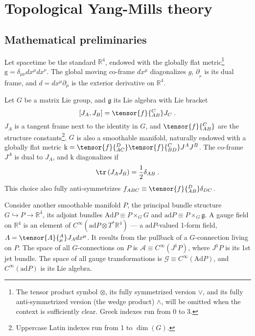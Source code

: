 \documentclass[../main/tex]{subfiles}
\begin{document}
\section{Topological Yang-Mills theory}\label{sec:tym}

\subsection{Mathematical preliminaries}\label{ssec:math-preliminaries;sec:tym}

Let spacetime be the standard $\mathbb{R}^4$, endowed with the globally flat metric\footnote{The tensor product symbol $\otimes$, its fully symmetrized version $\vee$, and its fully anti-symmetrized version (the wedge product) $\wedge$, will be omitted when the context is sufficiently clear. Greek indexes run from 0 to 3.} $ \mathrm{g} =\delta_{\mu\nu}dx^\mu dx^\nu$. The global moving co-frame $dx^\mu$ diagonalizes $ g $, $ \partial_{ _\mu } $ is its dual frame, and $d=dx^{\mu}\partial_{ \mu }$ is the exterior derivative on $\mathbb{R}^4$.

Let $G$ be a matrix Lie group, and $\mathfrak{g}$ its Lie algebra with Lie bracket
\begin{equation}
  \label{eq:G lie algebra}
  \left[ J_{A}, J_{B} \right]=\tensor{f}{_{AB}^C}J_C \;.
\end{equation}
$J_A$ is a tangent frame next to the identity in $G$, and $\tensor{f}{_{AB}^C}$ are the structure constants\footnote{Uppercase Latin indexes run from 1 to $\dim\left(G\right)$.}. $G$ is also a smoothable manifold, naturally endowed with a globally flat metric $ \mathrm{k} = \tensor{ f }{ _{AC}^D } \tensor{ f }{ _{BD}^C } J^A J^B $. The co-frame $ J^A $ is dual to $J_A$, and $ \mathrm{k} $ diagonalizes if
\begin{equation}
  \label{eq:orthonormal generators}
  \tr\left(J_A J_B\right) = \frac{1}{2}\delta_{AB} \;.
\end{equation}
This choice also fully anti-symmetrizes $f_{ABC}\equiv \tensor{f}{_{AB}^D}\delta_{DC}$.

Consider another smoothable manifold $ P $, the principal bundle structure $G \hookrightarrow P \rightarrow \mathbb{R}^4$, its adjoint bundles $ \mathrm{Ad} P \equiv P \times_G G $ and $ \mathrm{ad}P \equiv P \times_G \mathfrak{g}$. A gauge field on $ \mathbb{R}^4 $ is an element of $C^\infty \left( \mathrm{ad}P \otimes T^*\mathbb{R}^4 \right)$ --- a $ \mathrm{ad} P $-valued 1-form field, $ A=\tensor{A}{ ^A_\mu }J_A dx^\mu $. It results from the pullback of a $G$-connection living on $ P $. The space of all $G$-connections on $ P $ is $ \mathcal{A} \equiv C^{ \infty } \left( J^1 P \right) $, where $ J^1 P $ is its 1st jet bundle. The space of all gauge transformations is $ \mathcal{G} \equiv C^{ \infty }\left( \mathrm{Ad}P \right) $, and $ C^{ \infty } \left( \mathrm{ad} P \right) $ is its Lie algebra.
\end{document}
